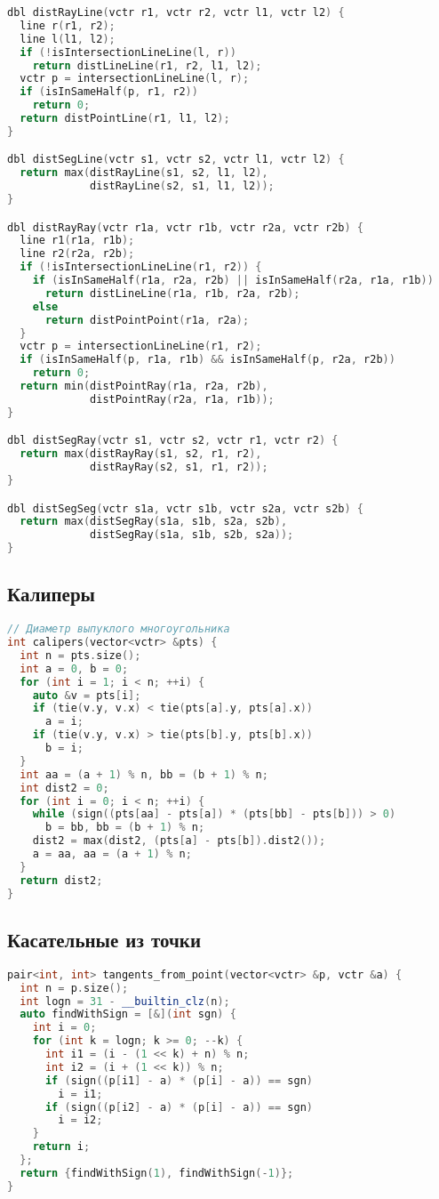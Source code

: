 \documentclass[9pt,a4paper,landscape,twosided]{extarticle}
\begin{document}
\begin{multicols*}{3}
\begin{lstlisting}[language=C++]
dbl distRayLine(vctr r1, vctr r2, vctr l1, vctr l2) {
  line r(r1, r2);
  line l(l1, l2);
  if (!isIntersectionLineLine(l, r))
    return distLineLine(r1, r2, l1, l2);
  vctr p = intersectionLineLine(l, r);
  if (isInSameHalf(p, r1, r2))
    return 0;
  return distPointLine(r1, l1, l2);
}

dbl distSegLine(vctr s1, vctr s2, vctr l1, vctr l2) {
  return max(distRayLine(s1, s2, l1, l2),
             distRayLine(s2, s1, l1, l2));
}

dbl distRayRay(vctr r1a, vctr r1b, vctr r2a, vctr r2b) {
  line r1(r1a, r1b);
  line r2(r2a, r2b);
  if (!isIntersectionLineLine(r1, r2)) {
    if (isInSameHalf(r1a, r2a, r2b) || isInSameHalf(r2a, r1a, r1b))
      return distLineLine(r1a, r1b, r2a, r2b);
    else
      return distPointPoint(r1a, r2a);
  }
  vctr p = intersectionLineLine(r1, r2);
  if (isInSameHalf(p, r1a, r1b) && isInSameHalf(p, r2a, r2b))
    return 0;
  return min(distPointRay(r1a, r2a, r2b),
             distPointRay(r2a, r1a, r1b));
}

dbl distSegRay(vctr s1, vctr s2, vctr r1, vctr r2) {
  return max(distRayRay(s1, s2, r1, r2),
             distRayRay(s2, s1, r1, r2));
}

dbl distSegSeg(vctr s1a, vctr s1b, vctr s2a, vctr s2b) {
  return max(distSegRay(s1a, s1b, s2a, s2b),
             distSegRay(s1a, s1b, s2b, s2a));
}

\end{lstlisting}

\subsection{Калиперы}
\begin{lstlisting}[language=C++]
// Диаметр выпуклого многоугольника
int calipers(vector<vctr> &pts) {
  int n = pts.size();
  int a = 0, b = 0;
  for (int i = 1; i < n; ++i) {
    auto &v = pts[i];
    if (tie(v.y, v.x) < tie(pts[a].y, pts[a].x))
      a = i;
    if (tie(v.y, v.x) > tie(pts[b].y, pts[b].x))
      b = i;
  }
  int aa = (a + 1) % n, bb = (b + 1) % n;
  int dist2 = 0;
  for (int i = 0; i < n; ++i) {
    while (sign((pts[aa] - pts[a]) * (pts[bb] - pts[b])) > 0)
      b = bb, bb = (b + 1) % n;
    dist2 = max(dist2, (pts[a] - pts[b]).dist2());
    a = aa, aa = (a + 1) % n;
  }
  return dist2;
}
\end{lstlisting}

\subsection{Касательные из точки}
\begin{lstlisting}[language=C++]
pair<int, int> tangents_from_point(vector<vctr> &p, vctr &a) {
  int n = p.size();
  int logn = 31 - __builtin_clz(n);
  auto findWithSign = [&](int sgn) {
    int i = 0;
    for (int k = logn; k >= 0; --k) {
      int i1 = (i - (1 << k) + n) % n;
      int i2 = (i + (1 << k)) % n;
      if (sign((p[i1] - a) * (p[i] - a)) == sgn)
        i = i1;
      if (sign((p[i2] - a) * (p[i] - a)) == sgn)
        i = i2;
    }
    return i;
  };
  return {findWithSign(1), findWithSign(-1)};
}


\end{lstlisting}
\end{multicols*}
\end{document}
